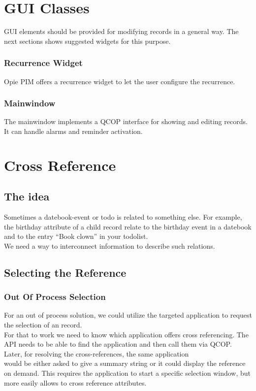 \section{GUI Classes}
GUI elements should be provided for modifying records in a general way. The next sections 
shows suggested widgets for this purpose.

\subsubsection{Recurrence Widget}
Opie PIM offers a recurrence widget to let the user
configure the recurrence.

\subsubsection{Mainwindow}
The mainwindow implements a QCOP interface for showing and 
editing records. It can handle alarms and reminder activation.

\section{Cross Reference}

\subsection{The idea}
Sometimes a datebook-event or todo is related to something else. 
For example, the birthday attribute of a child record relate
to the birthday event in a datebook and to the entry ``Book clown''
in your todolist.\\
We need a way to interconnect information to describe such relations.

\subsection{Selecting the Reference}
\subsubsection{Out Of Process Selection}
For an out of process solution, we could utilize the targeted
application to request the selection of an record.\\
For that to work we need to know which application offers
cross referencing. The API needs to be able to find the
application and then call them via QCOP.\\
Later, for resolving the cross-references, the same application\\
would be either asked to give a summary string or it could
display the reference on demand. This requires the application
to start a specific selection window, but more easily
allows to cross reference attributes. 

